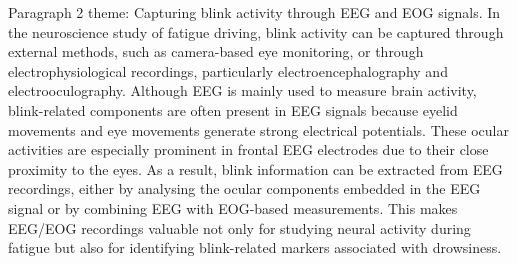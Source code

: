 Paragraph 2 theme: Capturing blink activity through EEG and EOG signals.
In the neuroscience study of fatigue driving, blink activity can be captured through external methods, such as camera-based eye monitoring, or through electrophysiological recordings, particularly electroencephalography and electrooculography. Although EEG is mainly used to measure brain activity, blink-related components are often present in EEG signals because eyelid movements and eye movements generate strong electrical potentials. These ocular activities are especially prominent in frontal EEG electrodes due to their close proximity to the eyes. As a result, blink information can be extracted from EEG recordings, either by analysing the ocular components embedded in the EEG signal or by combining EEG with EOG-based measurements. This makes EEG/EOG recordings valuable not only for studying neural activity during fatigue but also for identifying blink-related markers associated with drowsiness.